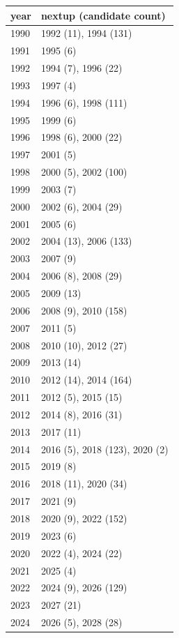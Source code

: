 \footnotesize\begin{tabular}[t]{ll}
\toprule
year & nextup (candidate count)\\
\midrule
1990 & 1992 (11), 1994 (131)\\
1991 & 1995 (6)\\
1992 & 1994 (7), 1996 (22)\\
1993 & 1997 (4)\\
1994 & 1996 (6), 1998 (111)\\
1995 & 1999 (6)\\
1996 & 1998 (6), 2000 (22)\\
1997 & 2001 (5)\\
1998 & 2000 (5), 2002 (100)\\
1999 & 2003 (7)\\
2000 & 2002 (6), 2004 (29)\\
2001 & 2005 (6)\\
2002 & 2004 (13), 2006 (133)\\
2003 & 2007 (9)\\
2004 & 2006 (8), 2008 (29)\\
2005 & 2009 (13)\\
2006 & 2008 (9), 2010 (158)\\
2007 & 2011 (5)\\
2008 & 2010 (10), 2012 (27)\\
2009 & 2013 (14)\\
2010 & 2012 (14), 2014 (164)\\
2011 & 2012 (5), 2015 (15)\\
2012 & 2014 (8), 2016 (31)\\
2013 & 2017 (11)\\
2014 & 2016 (5), 2018 (123), 2020 (2)\\
2015 & 2019 (8)\\
2016 & 2018 (11), 2020 (34)\\
2017 & 2021 (9)\\
2018 & 2020 (9), 2022 (152)\\
2019 & 2023 (6)\\
2020 & 2022 (4), 2024 (22)\\
2021 & 2025 (4)\\
2022 & 2024 (9), 2026 (129)\\
2023 & 2027 (21)\\
2024 & 2026 (5), 2028 (28)\\
\bottomrule
\end{tabular}
